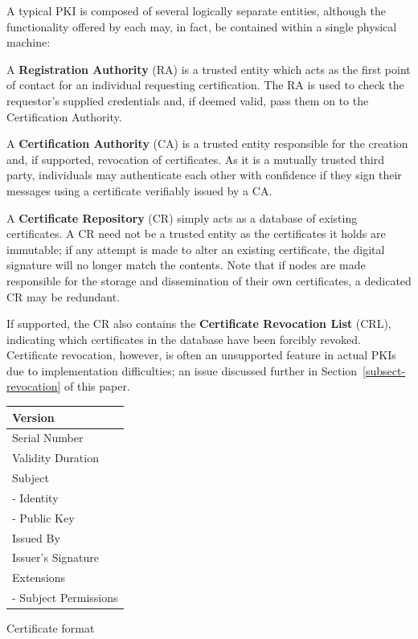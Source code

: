 \documentclass[pdftex,conference,10pt]{IEEEtran}
\begin{document}
A typical PKI is composed of several logically separate entities,
although the functionality offered by each may, in fact, be
contained within a single physical machine:

A \textbf{Registration Authority} (RA) is a trusted entity which acts
as the first point of contact for an individual requesting
certification. The RA is used to check the requestor's supplied
credentials and, if deemed valid, pass them on to the Certification
Authority.

A \textbf{Certification Authority} (CA) is a trusted entity responsible
for the creation and, if supported, revocation of certificates. As it
is a mutually trusted third party, individuals may authenticate each
other with confidence if they sign their messages using a certificate
verifiably issued by a CA.

A \textbf{Certificate Repository} (CR) simply acts as a database of
existing certificates. A CR need not be a trusted entity as the
certificates it holds are immutable; if any attempt is made to alter an
existing certificate, the digital signature will no longer match the
contents. Note that if nodes are made responsible for the storage and
dissemination of their own certificates, a dedicated CR may be
redundant.

If supported, the CR also contains the \textbf{Certificate Revocation
List} (CRL), indicating which certificates in the database have been
forcibly revoked. Certificate revocation, however, is often an
unsupported feature in actual PKIs due to implementation difficulties;
an issue discussed further in Section~\ref{subsect-revocation} of this
paper.

\begin{floatingtable}[r]{
\label{fig-certificate}
\begin{tabular}{|l|}
\hline
Version\\\hline
Serial Number\\\hline
Validity Duration\\\hline
Subject\\
- Identity\\
- Public Key\\\hline
Issued By\\\hline
Issuer's Signature\\\hline
Extensions\\
- Subject Permissions\\\hline
\end{tabular}
}
\caption{Certificate format}
\end{floatingtable}
\end{document}
